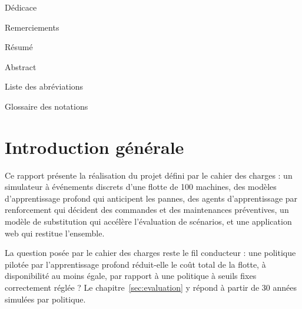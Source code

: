 \documentclass[11pt,a4paper,oneside]{report}
\newcommand{\liminaire}[1]{%
  \clearpage\thispagestyle{liminaires}%
  {\sffamily\fontsize{20}{24}\selectfont\color{primaire}#1}\par
  \vspace{0.2em}{\color{accent}\rule{2.2cm}{2.2pt}}\par\vspace{1.1em}}
\begin{document}
\hypersetup{pageanchor=true}
\pagestyle{liminaires}

\liminaire{Dédicace}


\liminaire{Remerciements}


\liminaire{Résumé}


\liminaire{Abstract}


\clearpage\thispagestyle{liminaires}
\tableofcontents

\clearpage\thispagestyle{liminaires}
\listoffigures

\clearpage\thispagestyle{liminaires}
\listoftables

\liminaire{Liste des abréviations}


\liminaire{Glossaire des notations}


\clearpage
{}
\pagestyle{corps}

\chapter*{Introduction générale}
\markboth{\textcolor{accent}{Introduction générale}}{}

Ce rapport présente la réalisation du projet défini par le cahier des charges : un simulateur à événements discrets d'une flotte de 100 machines, des modèles d'apprentissage profond qui anticipent les pannes, des agents d'apprentissage par renforcement qui décident des commandes et des maintenances préventives, un modèle de substitution qui accélère l'évaluation de scénarios, et une application web qui restitue l'ensemble.

La question posée par le cahier des charges reste le fil conducteur : une politique pilotée par l'apprentissage profond réduit-elle le coût total de la flotte, à disponibilité au moins égale, par rapport à une politique à seuils fixes correctement réglée ? Le chapitre~\ref{sec:evaluation} y répond à partir de 30 années simulées par politique.
\end{document}
